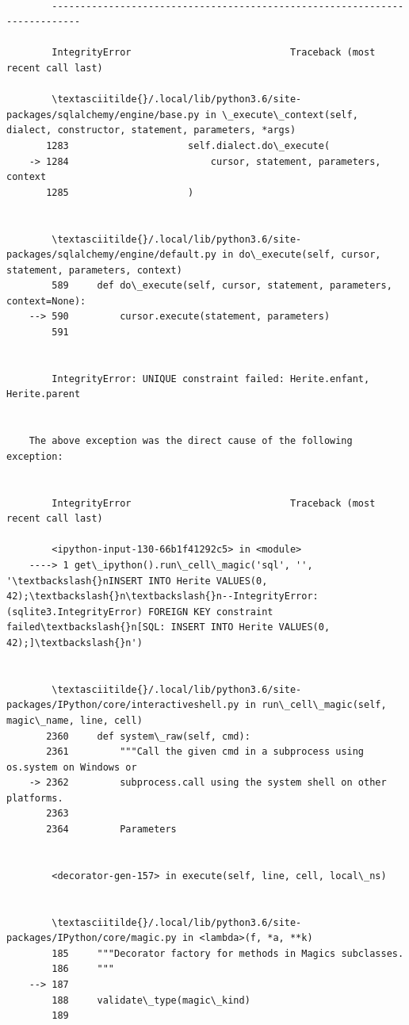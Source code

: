 \documentclass[11pt]{article}
\begin{document}
    \begin{Verbatim}[commandchars=\\\{\}]

        ---------------------------------------------------------------------------

        IntegrityError                            Traceback (most recent call last)

        \textasciitilde{}/.local/lib/python3.6/site-packages/sqlalchemy/engine/base.py in \_execute\_context(self, dialect, constructor, statement, parameters, *args)
       1283                     self.dialect.do\_execute(
    -> 1284                         cursor, statement, parameters, context
       1285                     )


        \textasciitilde{}/.local/lib/python3.6/site-packages/sqlalchemy/engine/default.py in do\_execute(self, cursor, statement, parameters, context)
        589     def do\_execute(self, cursor, statement, parameters, context=None):
    --> 590         cursor.execute(statement, parameters)
        591 


        IntegrityError: UNIQUE constraint failed: Herite.enfant, Herite.parent

        
    The above exception was the direct cause of the following exception:


        IntegrityError                            Traceback (most recent call last)

        <ipython-input-130-66b1f41292c5> in <module>
    ----> 1 get\_ipython().run\_cell\_magic('sql', '', '\textbackslash{}nINSERT INTO Herite VALUES(0, 42);\textbackslash{}n\textbackslash{}n--IntegrityError: (sqlite3.IntegrityError) FOREIGN KEY constraint failed\textbackslash{}n[SQL: INSERT INTO Herite VALUES(0, 42);]\textbackslash{}n')
    

        \textasciitilde{}/.local/lib/python3.6/site-packages/IPython/core/interactiveshell.py in run\_cell\_magic(self, magic\_name, line, cell)
       2360     def system\_raw(self, cmd):
       2361         """Call the given cmd in a subprocess using os.system on Windows or
    -> 2362         subprocess.call using the system shell on other platforms.
       2363 
       2364         Parameters


        <decorator-gen-157> in execute(self, line, cell, local\_ns)


        \textasciitilde{}/.local/lib/python3.6/site-packages/IPython/core/magic.py in <lambda>(f, *a, **k)
        185     """Decorator factory for methods in Magics subclasses.
        186     """
    --> 187 
        188     validate\_type(magic\_kind)
        189 



\end{Verbatim}
\end{document}
